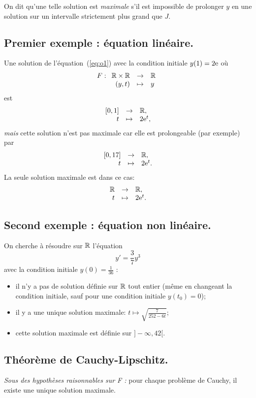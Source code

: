On dit qu'une telle solution est \emph{maximale} s'il est
impossible de prolonger $y$ en une solution sur un intervalle strictement
plus grand que $J$.

\subsection{Premier exemple : équation linéaire.}
Une solution de l'équation~(\ref{eq:o1}) avec la condition initiale $y(1)=2
\mathrm{e}$ où
\begin{equation*}
  F:\begin{array}[t]{rcl} \mathbb{R}\times \mathbb{R} & \rightarrow & \mathbb{R}\\ (y,t) & \mapsto & y\\ \end{array}
\end{equation*}
est
\begin{equation*}
  \begin{array}[t]{rcl} [0,1] & \rightarrow & \mathbb{R},\\ t & \mapsto & 2 \mathrm{e}^{t},\\ \end{array}
\end{equation*}
\emph{mais} cette solution n'est pas maximale car elle est prolongeable (par exemple) par
\begin{equation*}
  \begin{array}[t]{rcl} [0,17] & \rightarrow & \mathbb{R},\\ t & \mapsto & 2 \mathrm{e}^{t}.\\ \end{array}
\end{equation*}
La seule solution maximale est dans ce cas:
\begin{equation*}
  \begin{array}[t]{rcl} \mathbb{R} & \rightarrow & \mathbb{R},\\ t & \mapsto & 2\mathrm{e}^{t}.\\ \end{array}
\end{equation*}

\subsection{Second exemple : équation non linéaire.}

On cherche à résoudre sur $\mathbb{R}$ l'équation
\begin{equation*}
  y' = \frac{3}{7}y^{3}
\end{equation*}
avec la condition initiale $y(0)=\frac{1}{36}$ :

\begin{itemize}
\item il n'y a pas de solution définie sur $\mathbb{R}$ tout entier (même en
  changeant la condition initiale, sauf pour une condition initiale $y(t_{0})=0$);
\item il y a une unique solution maximale: $t\mapsto\sqrt{\frac{7}{252 - 6t}}$;
\item cette solution maximale est définie sur $]-\infty, 42[$.
\end{itemize}
\subsection{Théorème de Cauchy-Lipschitz.}

\emph{Sous des hypothèses raisonnables sur F :} pour chaque problème de Cauchy, il existe une unique solution
maximale.

